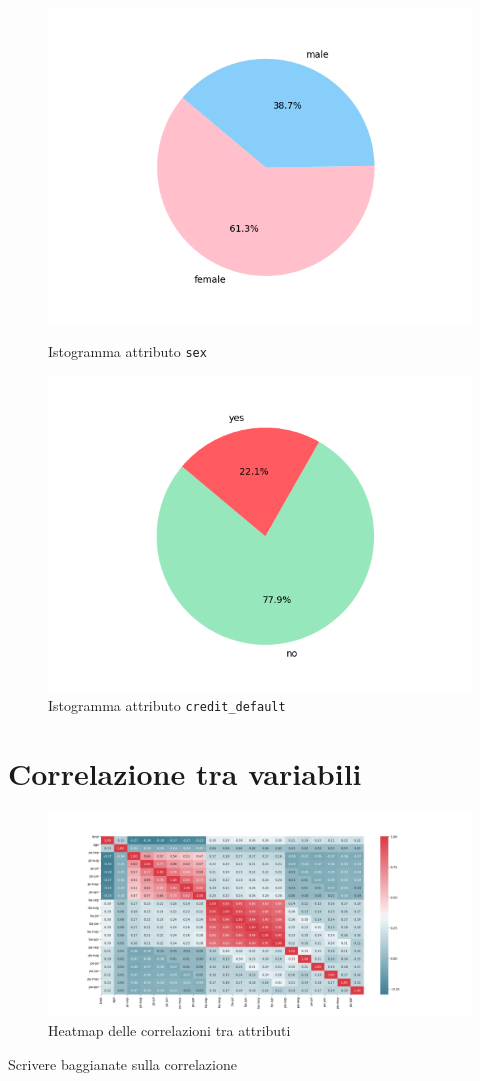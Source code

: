 \begin{figure}[!htb]
  \includegraphics[width=\linewidth]{img/sex-dist.png}
  \caption{Istogramma attributo \texttt{sex}}\label{sex-dist}
\endminipage\hfill
{}
  \includegraphics[width=\linewidth]{img/default-dist.png}
  \caption{Istogramma attributo \texttt{credit\_default}}\label{default-dist}
\endminipage\hfill
\end{figure}
\newpage
\section{Correlazione tra variabili}
\begin{figure}[!htb]
\centering
  \includegraphics[width=\linewidth]{img/heatmap.png}
  \caption{Heatmap delle correlazioni tra attributi}\label{heatmap}
\end{figure}

Scrivere baggianate sulla correlazione


